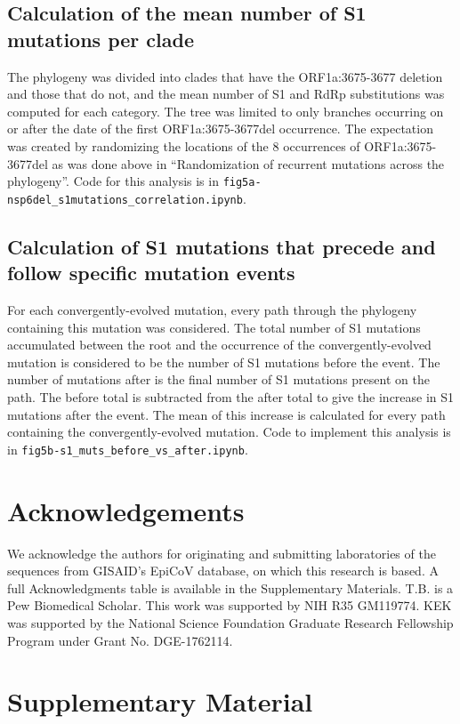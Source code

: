 \documentclass[12pt, letterpaper]{article}
\newcommand{\beginsupplement}{%
	\setcounter{figure}{0}
	\renewcommand{\thefigure}{S\arabic{figure}}%
}
\begin{document}
\subsection*{Calculation of the mean number of S1 mutations per clade}
The phylogeny was divided into clades that have the ORF1a:3675-3677 deletion and those that do not, and the mean number of S1 and RdRp substitutions was computed for each category. The tree was limited to only branches occurring on or after the date of the first ORF1a:3675-3677del occurrence. The expectation was created by randomizing the locations of the 8 occurrences of ORF1a:3675-3677del as was done above in “Randomization of recurrent mutations across the phylogeny”. Code for this analysis is in \texttt{fig5a-nsp6del\_s1mutations\_correlation.ipynb}.

\subsection*{Calculation of S1 mutations that precede and follow specific mutation events}
For each convergently-evolved mutation, every path through the phylogeny containing this mutation was considered. The total number of S1 mutations accumulated between the root and the occurrence of the convergently-evolved mutation is considered to be the number of S1 mutations before the event. The number of mutations after is the final number of S1 mutations present on the path. The before total is subtracted from the after total to give the increase in S1 mutations after the event. The mean of this increase is calculated for every path containing the convergently-evolved mutation. Code to implement this analysis is in \texttt{fig5b-s1\_muts\_before\_vs\_after.ipynb}.

\section*{Acknowledgements}
\fussy
We acknowledge the authors for originating and submitting laboratories of the sequences from GISAID’s EpiCoV database, on which this research is based. A full Acknowledgments table is available in the Supplementary Materials. T.B. is a Pew Biomedical Scholar. This work was supported by NIH R35 GM119774. KEK was supported by the National Science Foundation Graduate Research Fellowship Program under Grant No. DGE-1762114.
\clearpage
\small


\normalsize
\clearpage

\section*{Supplementary Material}
\beginsupplement
\end{document}
